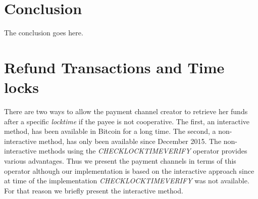 \documentclass[10pt,journal,compsoc]{IEEEtran}
\begin{document}




\section{Conclusion}
The conclusion goes here.






%


\appendices
\section{Refund Transactions and Time locks}
\label{app:timelock}

There are two ways to allow the payment channel creator to retrieve her funds after a specific \emph{locktime} if the payee is not cooperative. The first, an interactive method, has been available in Bitcoin for a long time. The second, a non-interactive method, has only been available since December 2015. The non-interactive methods using the \emph{CHECKLOCKTIMEVERIFY} operator provides various advantages. Thus we present the payment channels in terms of this operator although our implementation is based on the interactive approach since at time of the implementation \emph{CHECKLOCKTIMEVERIFY} was not available. For that reason we briefly present the interactive method.
\end{document}
